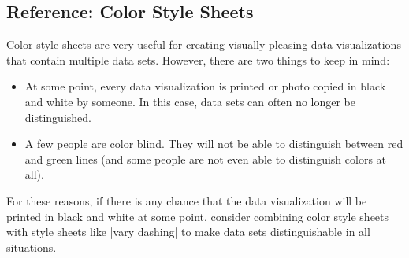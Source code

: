 \subsection{Reference: Color Style Sheets}

Color style sheets are very useful for creating visually pleasing data
visualizations that contain multiple data sets. However, there are two things
to keep in mind:
%
\begin{itemize}
    \item At some point, every data visualization is printed or photo copied in
        black and white by someone. In this case, data sets can often no longer
        be distinguished.
    \item A few people are color blind. They will not be able to distinguish
        between red and green lines (and some people are not even able to
        distinguish colors at all).
\end{itemize}

For these reasons, if there is any chance that the data visualization will be
printed in black and white at some point, consider combining color style sheets
with style sheets like |vary dashing| to make data sets distinguishable in all
situations.

